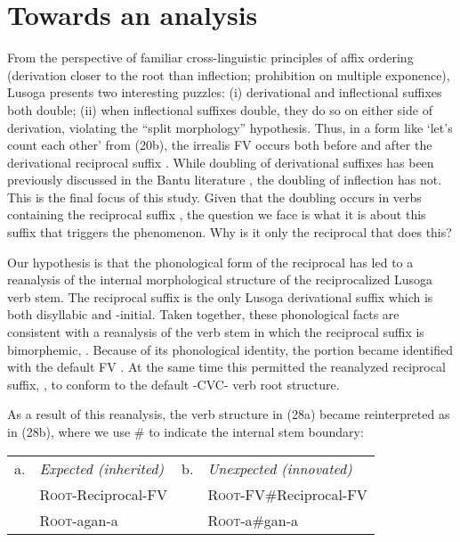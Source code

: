 \documentclass[output=paper,
modfonts
]{LSP/langsci}
\begin{document}
\section{Towards an analysis}

From the perspective of familiar cross-linguistic principles of affix
ordering (derivation closer to the root than inflection; prohibition on
multiple exponence), Lusoga presents two interesting puzzles: (i)
derivational and inflectional suffixes both double; (ii) when
inflectional suffixes double, they do so on either side of derivation,
violating the ``split morphology'' hypothesis. Thus, in a form like
\form{tù-{[}bàl-é-gàn-é} `let's count each other' from (20b), the
irrealis FV  occurs both before and after the derivational
reciprocal suffix . While doubling of derivational suffixes
has been previously discussed in the Bantu literature \citep{hyman2003}, the
doubling of inflection has not. This is the final focus of this study.
Given that the doubling occurs in verbs containing the reciprocal suffix
, the question we face is what it is about this suffix that
triggers the phenomenon. Why is it only the reciprocal that does this?

Our hypothesis is that the phonological form of the reciprocal has led
to a reanalysis of the internal morphological structure of the
reciprocalized Lusoga verb stem. The reciprocal suffix  is
the only Lusoga derivational suffix which is both disyllabic and
-initial. Taken together, these phonological facts are
consistent with a reanalysis of the verb stem in which the reciprocal
suffix is bimorphemic, . Because of its phonological
identity, the  portion became identified with the default FV
. At the same time this permitted the reanalyzed reciprocal
suffix, , to conform to the default -CVC- verb root
structure.

As a result of this reanalysis, the verb structure in (28a) became
reinterpreted as in (28b), where we use \# to indicate the internal stem
boundary:

\ea\begin{tabular}[t]{@{}llrl}
a. & \emph{Expected (inherited)} & b. &  \emph{Unexpected (innovated)}  \\
& \textsc{Root}-Reciprocal-FV & & \textsc{Root}-FV\#Reciprocal-FV \\
 & \textsc{Root}-agan-a & & \textsc{Root}-a\#gan-a
\end{tabular}
\z
\end{document}

